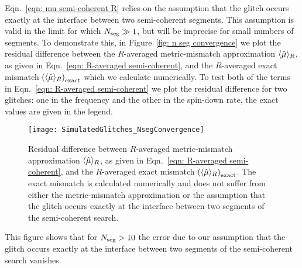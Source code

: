 \documentclass[../full_thesis/full_thesis.tex]{subfiles}
\begin{document}
Eqn.~\eqref{eqn: mu semi-coherent R} relies on the assumption that the glitch
occurs exactly at the interface between two semi-coherent segments. This
assumption is valid in the limit for which $N_{\textrm{seg}} \gg 1$, but will be imprecise
for small numbers of segments. To demonstrate this, in Figure~\ref{fig: n seg
convergence} we plot the residual difference between the $R$-averaged
metric-mismatch approximation $\langle \hat{\mu} \rangle_R$, as given in
Eqn.~\eqref{eqn: R-averaged semi-coherent}, and the $R$-averaged exact mismatch
$\left(\langle \hat{\mu} \rangle_{R}\right)_{\textrm{exact}}$ which we calculate
numerically. To test both of the terms in Eqn.~\eqref{eqn: R-averaged semi-coherent}
we plot the residual difference for two glitches: one in the frequency and
the other in the spin-down rate, the exact values are given in the legend.
\begin{figure}[htb]
\centering
\texttt{[image: SimulatedGlitches\_NsegConvergence]}
\caption{Residual difference between $R$-averaged
metric-mismatch approximation $\langle \hat{\mu} \rangle_R$, as given in
Eqn.~\eqref{eqn: R-averaged semi-coherent}, and the $R$-averaged exact mismatch
$\left(\langle \hat{\mu} \rangle_{R}\right)_{\textrm{exact}}$. The exact mismatch
is calculated numerically and does not suffer from either the metric-mismatch
approximation or the assumption that the glitch occurs exactly at the interface
between two segments of the semi-coherent search.}
\label{fig: n seg convergence}
\end{figure}
This figure shows that for $N_{\textrm{seg}} > 10$ the error due to our assumption that
the glitch occurs exactly at the interface between two segments of the
semi-coherent search vanishes.
\end{document}
